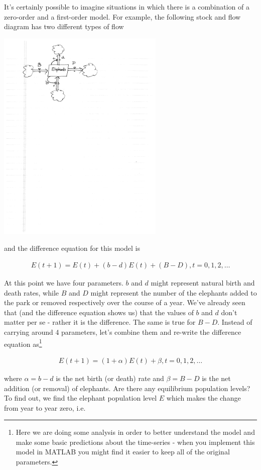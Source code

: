 \documentclass{tufte-handout}
\begin{document}
It's certainly possible to imagine situations in which there is a combination of a zero-order and a first-order model. For example, the following stock and flow diagram has two different types of flow

\centerline{\includegraphics[width=8cm]{figs/combined_model}}

and the difference equation for this model is

\begin{eqnarray*}
E(t+1) = E(t) + (b-d)E(t) + (B-D), t = 0, 1, 2, \ldots
\end{eqnarray*}

At this point we have four parameters. $b$ and $d$ might represent natural birth and death rates, while $B$ and $D$ might represent the number of the elephants added to the park or removed respectively over the course of a year. We've already seen that (and the difference equation shows us) that the values of $b$ and $d$ don't matter per se - rather it is the difference. The same is true for $B-D$. Instead of carrying around 4 parameters, let's combine them and re-write the difference equation as\footnote{Here we are doing some analysis in order to better understand the model and make some basic predictions about the time-series - when you implement this model in MATLAB you might find it easier to keep all of the original parameters.}

\begin{eqnarray*}
E(t+1) = (1+\alpha)E(t) + \beta, t = 0, 1, 2, \ldots
\end{eqnarray*}

where $\alpha = b-d$ is the net birth (or death) rate and $\beta = B-D$ is the net addition (or removal) of elephants. Are there any equilibrium population levels? To find out, we find the elephant population level $E$ which makes the change from year to year zero, i.e.
\end{document}
